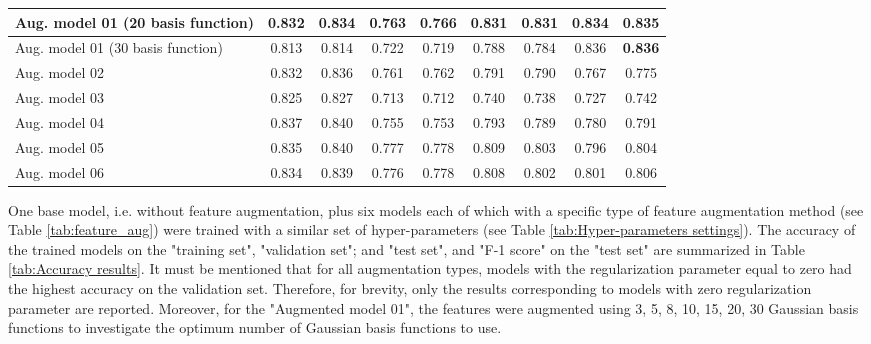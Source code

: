 \documentclass[10pt,conference,compsocconf]{IEEEtran}
\begin{document}
\begin{table*}[h]
{\begin{center}
\begin{tabular}{l|cc|cc|cc|cc|}
\multicolumn{1}{|l|}{Aug. model 01 (20 basis function)} & 0.832       & 0.834          & 0.763                           & 0.766          & 0.831                           & 0.831          & 0.834                           & 0.835          \\ \hline
\multicolumn{1}{|l|}{Aug. model 01 (30 basis function)} & 0.813       & 0.814          & 0.722                           & 0.719          & 0.788                           & 0.784          & 0.836                           & \textbf{0.836} \\ \hline
\multicolumn{1}{|l|}{Aug. model 02}                     & 0.832       & 0.836          & 0.761                           & 0.762          & 0.791                           & 0.790          & 0.767                           & 0.775          \\ \hline
\multicolumn{1}{|l|}{Aug. model 03}                     & 0.825       & 0.827          & 0.713                           & 0.712          & 0.740                           & 0.738          & 0.727                           & 0.742          \\ \hline
\multicolumn{1}{|l|}{Aug. model 04}                     & 0.837       & 0.840          & 0.755                           & 0.753          & 0.793                           & 0.789          & 0.780                           & 0.791          \\ \hline
\multicolumn{1}{|l|}{Aug. model 05}                     & 0.835       & 0.840          & 0.777                           & 0.778          & 0.809                           & 0.803          & 0.796                           & 0.804          \\ \hline
\multicolumn{1}{|l|}{Aug. model 06}                     & 0.834       & 0.839          & 0.776                           & 0.778          & 0.808                           & 0.802          & 0.801                           & 0.806          \\ \hline
\end{tabular}

\end{center}}
\end{table*}

\vspace{-10pt}
One base model, i.e. without feature augmentation, plus six models each of which with a specific type of feature augmentation method (see Table \ref{tab:feature_aug}) were trained with a similar set of hyper-parameters (see Table \ref{tab:Hyper-parameters settings}). The accuracy of the trained models on the "training set", "validation set"; and "test set", and "F-1 score" on the "test set" are summarized in Table \ref{tab:Accuracy results}. It must be mentioned that for all augmentation types, models with the regularization parameter equal to zero had the highest accuracy on the validation set. Therefore, for brevity, only the results corresponding to models with zero regularization parameter are reported. Moreover, for the "Augmented model 01", the features were augmented using 3, 5, 8, 10, 15, 20, 30 Gaussian basis functions to investigate the optimum number of Gaussian basis functions to use. 
\end{document}
